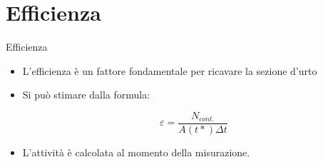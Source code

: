 \documentclass [xcolor=svgnames] {beamer}
\begin{document}
\section{Efficienza}
\begin{frame}{Efficienza}
	\begin{itemize}%
		\item<1-> L'efficienza è un fattore fondamentale per ricavare la sezione d'urto
		\item<2-> Si può stimare dalla formula:
		
		\begin{equation}
			\varepsilon = \dfrac{N_{cont.}}{A(t*) \Delta t}
		\end{equation}
		
		\item<3-> L'attività è calcolata al momento della misurazione. %
		
	\end{itemize}
\end{frame}
\end{document}
